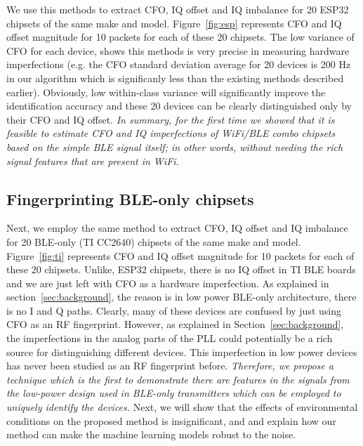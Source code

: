 We use this methods to extract CFO, IQ offset and IQ imbalance for 20 ESP32 chipsets of the same make and model. Figure~\ref{fig:esp} represents CFO and IQ offset magnitude for 10 packets for each of these 20 chipsets. The low variance of CFO for each device, shows this methods is very precise in measuring hardware imperfections (e.g. the CFO standard deviation average for 20 devices is 200 Hz in our algorithm which is significanly less than the existing methods described earlier). Obviously, low within-class variance will significantly improve the identification accuracy and these 20 devices can be clearly distinguished only by their CFO and IQ offset. \textit{In summary, for the first time we showed that it is feasible to estimate CFO and IQ imperfections of WiFi/BLE combo chipsets based on the simple BLE signal itself; in other words, without needing the rich signal features that are present in WiFi.}




\subsection{Fingerprinting BLE-only chipsets}%
\label{sec:methodology2}


Next, we employ the same method to extract CFO, IQ offset and IQ imbalance for 20 BLE-only (TI CC2640) chipsets of the same make and model. Figure~\ref{fig:ti} represents CFO and IQ offset magnitude for 10 packets for each of these 20 chipsets. Unlike, ESP32 chipsets, there is no IQ offset in TI BLE boards and we are just left with CFO as a hardware imperfection. As explained in section~\ref{sec:background}, the reason is in low power BLE-only architecture, there is no I and Q paths. Clearly, many of these devices are confused by just using CFO as an RF fingerprint. 
However, as explained in Section~\ref{sec:background}, the imperfections in the analog parts of the PLL could potentially be a rich source for distinguishing different devices. This imperfection in low power devices has never been studied as an RF fingerprint before. \textit{Therefore, we propose a technique which is the first to demonstrate there are features in the signals from the low-power design used in BLE-only transmitters which can be employed to uniquely identify the devices.} Next, we will show that the effects of environmental conditions on the proposed method is insignificant, and and explain how our method can make the machine learning models robust to the noise.




